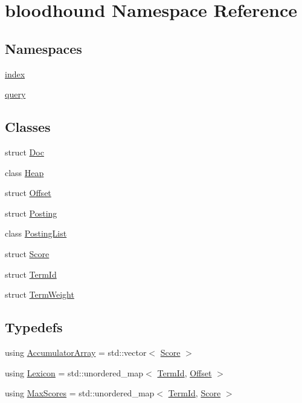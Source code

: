 \hypertarget{namespacebloodhound}{}\section{bloodhound Namespace Reference}
\label{namespacebloodhound}
\subsection*{Namespaces}
\begin{DoxyCompactItemize}
\item 
 \hyperlink{namespacebloodhound_1_1index}{index}
\item 
 \hyperlink{namespacebloodhound_1_1query}{query}
\end{DoxyCompactItemize}
\subsection*{Classes}
\begin{DoxyCompactItemize}
\item 
struct \hyperlink{structbloodhound_1_1Doc}{Doc}
\item 
class \hyperlink{classbloodhound_1_1Heap}{Heap}
\item 
struct \hyperlink{structbloodhound_1_1Offset}{Offset}
\item 
struct \hyperlink{structbloodhound_1_1Posting}{Posting}
\item 
class \hyperlink{classbloodhound_1_1PostingList}{Posting\+List}
\item 
struct \hyperlink{structbloodhound_1_1Score}{Score}
\item 
struct \hyperlink{structbloodhound_1_1TermId}{Term\+Id}
\item 
struct \hyperlink{structbloodhound_1_1TermWeight}{Term\+Weight}
\end{DoxyCompactItemize}
\subsection*{Typedefs}
\begin{DoxyCompactItemize}
\item 
using \hyperlink{namespacebloodhound_ae863daa54e3092bd2bc335e70f7a9dd7}{Accumulator\+Array} = std\+::vector$<$ \hyperlink{structbloodhound_1_1Score}{Score} $>$
\item 
using \hyperlink{namespacebloodhound_a94032a3533df0a1b6d3435bad57e6499}{Lexicon} = std\+::unordered\+\_\+map$<$ \hyperlink{structbloodhound_1_1TermId}{Term\+Id}, \hyperlink{structbloodhound_1_1Offset}{Offset} $>$
\item 
using \hyperlink{namespacebloodhound_a687d80c6f992eba8b820bf30a482f4b4}{Max\+Scores} = std\+::unordered\+\_\+map$<$ \hyperlink{structbloodhound_1_1TermId}{Term\+Id}, \hyperlink{structbloodhound_1_1Score}{Score} $>$
\end{DoxyCompactItemize}
